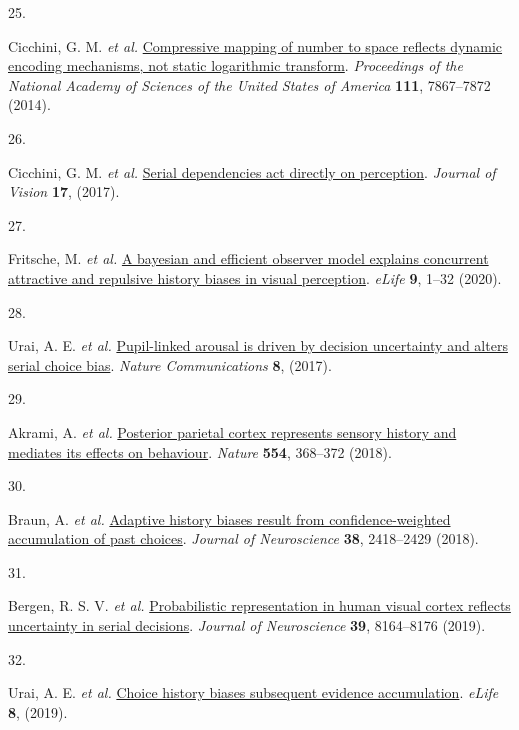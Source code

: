 \documentclass[
]{article}
\newlength{\cslhangindent}
\newlength{\csllabelwidth}
\newlength{\cslentryspacingunit} %
\newenvironment{CSLReferences}[2] %
 {%
  \setlength{\parindent}{0pt}
  \ifodd #1
  \let\oldpar\par
  \def\par{\hangindent=\cslhangindent\oldpar}
  \fi
  \setlength{\parskip}{#2\cslentryspacingunit}
 }%
 {}
\newcommand{\CSLLeftMargin}[1]{\parbox[t]{\csllabelwidth}{#1}}
\newcommand{\CSLRightInline}[1]{\parbox[t]{\linewidth - \csllabelwidth}{#1}\break}
\begin{document}
\begin{CSLReferences}{0}{0}
\leavevmode{}%
\CSLLeftMargin{25. }%
\CSLRightInline{Cicchini, G. M. \emph{et al.}
\href{https://doi.org/10.1073/pnas.1402785111}{{Compressive mapping of
number to space reflects dynamic encoding mechanisms, not static
logarithmic transform}}. \emph{Proceedings of the National Academy of
Sciences of the United States of America} \textbf{111}, 7867--7872
(2014).}

\leavevmode{}%
\CSLLeftMargin{26. }%
\CSLRightInline{Cicchini, G. M. \emph{et al.}
\href{https://doi.org/10.1167/17.14.6}{{Serial dependencies act directly
on perception}}. \emph{Journal of Vision} \textbf{17}, (2017).}

\leavevmode{}%
\CSLLeftMargin{27. }%
\CSLRightInline{Fritsche, M. \emph{et al.}
\href{https://doi.org/10.7554/eLife.55389}{{A bayesian and efficient
observer model explains concurrent attractive and repulsive history
biases in visual perception}}. \emph{eLife} \textbf{9}, 1--32 (2020).}

\leavevmode{}%
\CSLLeftMargin{28. }%
\CSLRightInline{Urai, A. E. \emph{et al.}
\href{https://doi.org/10.1038/ncomms14637}{{Pupil-linked arousal is
driven by decision uncertainty and alters serial choice bias}}.
\emph{Nature Communications} \textbf{8}, (2017).}

\leavevmode{}%
\CSLLeftMargin{29. }%
\CSLRightInline{Akrami, A. \emph{et al.}
\href{https://doi.org/10.1038/nature25510}{{Posterior parietal cortex
represents sensory history and mediates its effects on behaviour}}.
\emph{Nature} \textbf{554}, 368--372 (2018).}

\leavevmode{}%
\CSLLeftMargin{30. }%
\CSLRightInline{Braun, A. \emph{et al.}
\href{https://doi.org/10.1523/JNEUROSCI.2189-17.2017}{{Adaptive history
biases result from confidence-weighted accumulation of past choices}}.
\emph{Journal of Neuroscience} \textbf{38}, 2418--2429 (2018).}

\leavevmode{}%
\CSLLeftMargin{31. }%
\CSLRightInline{Bergen, R. S. V. \emph{et al.}
\href{https://doi.org/10.1523/JNEUROSCI.3212-18.2019}{{Probabilistic
representation in human visual cortex reflects uncertainty in serial
decisions}}. \emph{Journal of Neuroscience} \textbf{39}, 8164--8176
(2019).}

\leavevmode{}%
\CSLLeftMargin{32. }%
\CSLRightInline{Urai, A. E. \emph{et al.}
\href{https://doi.org/10.7554/eLife.46331}{{Choice history biases
subsequent evidence accumulation}}. \emph{eLife} \textbf{8}, (2019).}


\end{CSLReferences}
\end{document}
